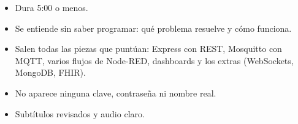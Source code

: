 \documentclass[11pt,a4paper]{article}
\begin{document}
\begin{itemize}[nosep]
  \item[$\square$] Dura 5:00 o menos.
  \item[$\square$] Se entiende sin saber programar: qué problema resuelve y cómo funciona.
  \item[$\square$] Salen todas las piezas que puntúan: Express con REST, Mosquitto con MQTT, varios flujos de Node-RED, dashboards y los extras (WebSockets, MongoDB, FHIR).
  \item[$\square$] No aparece ninguna clave, contraseña ni nombre real.
  \item[$\square$] Subtítulos revisados y audio claro.
\end{itemize}
\end{document}
